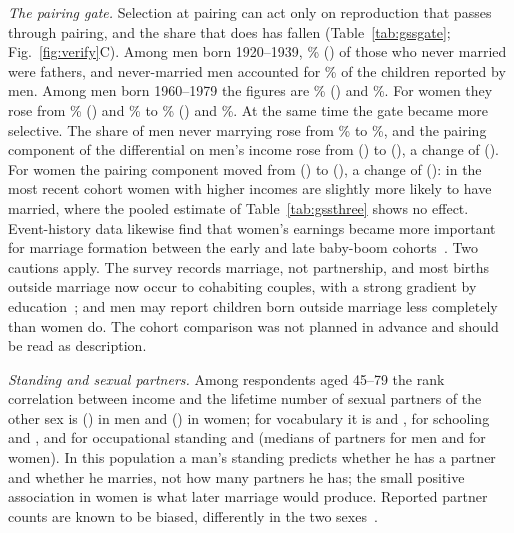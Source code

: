 \emph{The pairing gate.} Selection at pairing can act only on reproduction that passes through pairing, and the share that
does has fallen (Table~\ref{tab:gssgate}; Fig.~\ref{fig:verify}C). Among men born 1920--1939, \GssGateMOld\% (\GssGateMOldCI)
of those who never married were fathers, and never-married men accounted for \GssOutMOld\% of the children reported by men.
Among men born 1960--1979 the figures are \GssGateMNew\% (\GssGateMNewCI) and \GssOutMNew\%. For women they rose from
\GssGateWOld\% (\GssGateWOldCI) and \GssOutWOld\% to \GssGateWNew\% (\GssGateWNewCI) and \GssOutWNew\%. At the same time
the gate became more selective. The share of men never marrying rose from \GssNevMOld\% to \GssNevMNew\%, and the pairing
component of the differential on men's income rose from \GssPairMOld{} (\GssPairMOldCI) to \GssPairMNew{} (\GssPairMNewCI),
a change of \GssPairMChange{} (\GssPairMChangeCI). For women the pairing component moved from \GssPairWOld{}
(\GssPairWOldCI) to \GssPairWNew{} (\GssPairWNewCI), a change of \GssPairWChange{} (\GssPairWChangeCI): in the most recent
cohort women with higher incomes are slightly more likely to have married, where the pooled estimate of
Table~\ref{tab:gssthree} shows no effect. Event-history data likewise find that women's earnings became more important for
marriage formation between the early and late baby-boom cohorts~\cite{sweeney2002}. Two cautions apply. The survey records
marriage, not partnership, and most births outside marriage now occur to cohabiting couples, with a strong gradient by
education~\cite{lundberg2016}; and men may report children born outside marriage less completely than women do. The
cohort comparison was not planned in advance and should be read as description.

\emph{Standing and sexual partners.} Among respondents aged 45--79 the rank correlation between income and the lifetime
number of sexual partners of the other sex is \GssPartIncM{} (\GssPartIncMCI) in men and \GssPartIncW{} (\GssPartIncWCI)
in women; for vocabulary it is \GssPartVocM{} and \GssPartVocW, for schooling \GssPartSchM{} and \GssPartSchW, and for
occupational standing \GssPartPreM{} and \GssPartPreW{} (medians of \GssPartMedM{} partners for men and \GssPartMedW{} for
women). In this population a man's standing predicts whether he has a partner and whether he marries, not how many
partners he has; the small positive association in women is what later marriage would produce. Reported partner counts
are known to be biased, differently in the two sexes~\cite{mitchell2019}.

